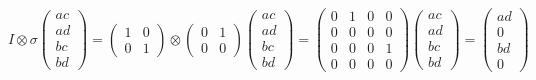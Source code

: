 \begin{equation}
     I \otimes \sigma  \begin{pmatrix} {a}{c} \\ {a}{d} \\ {b}{c} \\ {b}{d} \end{pmatrix} =  \begin{pmatrix}
    1 & 0 \\ 0 & 1
\end{pmatrix} \otimes \begin{pmatrix}
    0 & 1 \\ 0 & 0
\end{pmatrix} \begin{pmatrix} {a}{c} \\ {a}{d} \\ {b}{c} \\ {b}{d} \end{pmatrix} = \begin{pmatrix}
0 & 1 & 0 & 0 \\
0 & 0 & 0 & 0 \\
0 & 0 & 0 & 1 \\
0 & 0 & 0 & 0
\end{pmatrix} \begin{pmatrix} {a}{c} \\ {a}{d} \\ {b}{c} \\ {b}{d} \end{pmatrix} = \begin{pmatrix} {a}{d} \\ 0 \\ bd \\ 0 \end{pmatrix}
\end{equation}

